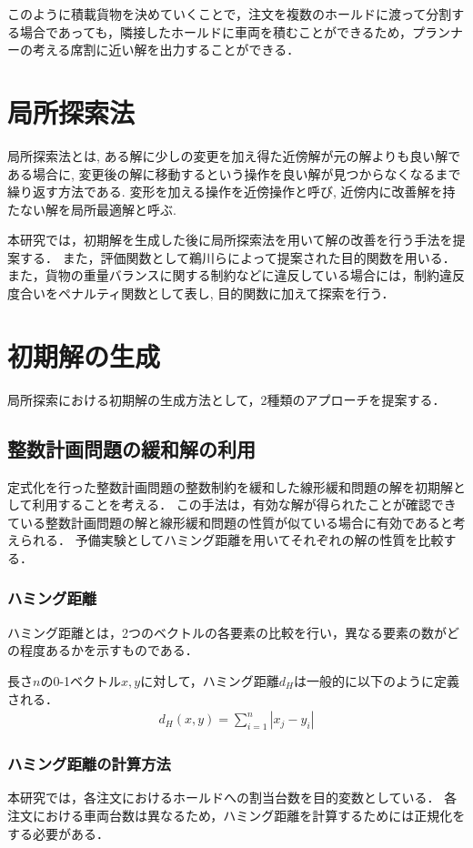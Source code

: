 このように積載貨物を決めていくことで，注文を複数のホールドに渡って分割する場合であっても，隣接したホールドに車両を積むことができるため，プランナーの考える席割に近い解を出力することができる．

\section{局所探索法}
局所探索法とは, ある解に少しの変更を加え得た近傍解が元の解よりも良い解である場合に, 変更後の解に移動するという操作を良い解が見つからなくなるまで繰り返す方法である.
変形を加える操作を近傍操作と呼び, 近傍内に改善解を持たない解を局所最適解と呼ぶ.

本研究では，初期解を生成した後に局所探索法を用いて解の改善を行う手法を提案する．
また，評価関数として鵜川らによって提案された目的関数\cite{ukawa}を用いる．
また，貨物の重量バランスに関する制約などに違反している場合には，制約違反度合いをペナルティ関数として表し, 目的関数に加えて探索を行う．

\section{初期解の生成}
\label{initial}
局所探索における初期解の生成方法として，2種類のアプローチを提案する．
\subsection{整数計画問題の緩和解の利用}
\label{relaxation}
定式化を行った整数計画問題の整数制約を緩和した線形緩和問題の解を初期解として利用することを考える．
この手法は，有効な解が得られたことが確認できている整数計画問題の解と線形緩和問題の性質が似ている場合に有効であると考えられる．
予備実験としてハミング距離を用いてそれぞれの解の性質を比較する．

\subsubsection{ハミング距離}
ハミング距離とは，2つのベクトルの各要素の比較を行い，異なる要素の数がどの程度あるかを示すものである．

長さ$n$の0-1ベクトル$x,y$に対して，ハミング距離$d_H$は一般的に以下のように定義される．
\begin{align*}
 d_H(x,y) =\sum_{i=1}^n |x_j-y_i|
\end{align*}

\subsubsection{ハミング距離の計算方法}
本研究では，各注文におけるホールドへの割当台数を目的変数としている．
各注文における車両台数は異なるため，ハミング距離を計算するためには正規化をする必要がある．

